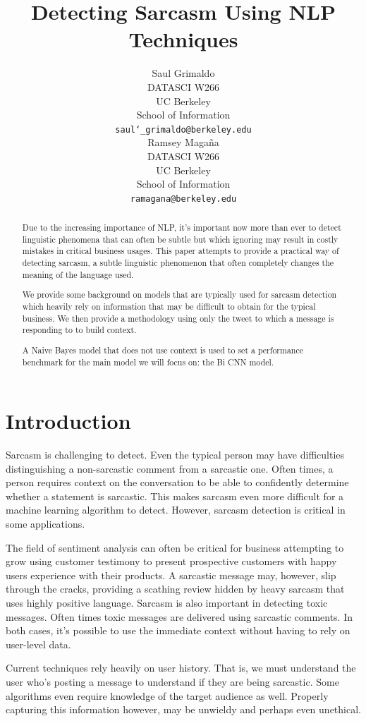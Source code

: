 \documentclass[11pt,a4paper]{article}
\title{Detecting Sarcasm Using NLP Techniques}
\author{Saul Grimaldo \\
  DATASCI W266\\
  UC Berkeley \\
  School of Information \\
  {\tt saul\char`_grimaldo@berkeley.edu} \\\And
  Ramsey Maga{\~n}a \\
  DATASCI W266\\
  UC Berkeley \\
  School of Information \\
  {\tt ramagana@berkeley.edu} \\}
\date{}
\begin{document}
\maketitle
\begin{abstract}
Due to the increasing importance of NLP, it's important now more than ever to detect linguistic phenomena that can often be subtle but which ignoring may result in costly mistakes in critical business usages. This paper attempts to provide a practical way of detecting sarcasm, a subtle linguistic phenomenon that often completely changes the meaning of the language used. 

We provide some background on models that are typically used for sarcasm detection which heavily rely on information that may be difficult to obtain for the typical business. We then provide a methodology using only the tweet to which a message is responding to to build context.

A Naive Bayes model that does not use context is used to set a performance benchmark for the main model we will focus on: the Bi CNN model.

\end{abstract}

\section{Introduction}
Sarcasm is challenging to detect. Even the typical person may have difficulties distinguishing a non-sarcastic comment from a sarcastic one. Often times, a person requires context on the conversation to be able to confidently determine whether a statement is sarcastic. This makes sarcasm even more difficult for a machine learning algorithm to detect. However, sarcasm detection is critical in some applications. 

The field of sentiment analysis can often be critical for business attempting to grow using customer testimony to present prospective customers with happy users experience with their products. A sarcastic message may, however, slip through the cracks, providing a scathing review hidden by heavy sarcasm that uses highly positive language. Sarcasm is also important in detecting toxic messages. Often times toxic messages are delivered using sarcastic comments. In both cases, it's possible to use the immediate context without having to rely on user-level data.

Current techniques rely heavily on user history. That is, we must understand the user who's posting a message to understand if they are
being sarcastic. Some algorithms even require knowledge of the target audience as well. Properly capturing this information however, may be unwieldy and perhaps even unethical. 
\end{document}
